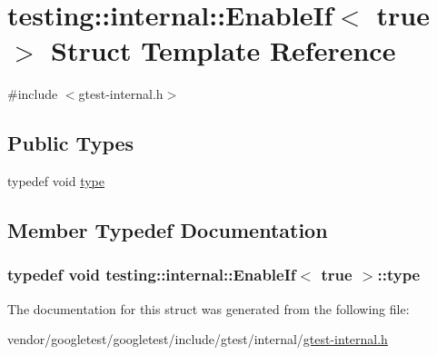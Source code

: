 \hypertarget{structtesting_1_1internal_1_1EnableIf_3_01true_01_4}{}\section{testing\+:\+:internal\+:\+:Enable\+If$<$ true $>$ Struct Template Reference}
\label{structtesting_1_1internal_1_1EnableIf_3_01true_01_4}


{\ttfamily \#include $<$gtest-\/internal.\+h$>$}

\subsection*{Public Types}
\begin{DoxyCompactItemize}
\item 
typedef void \hyperlink{structtesting_1_1internal_1_1EnableIf_3_01true_01_4_a9398d803f1fdd99ff41823746f6299ff}{type}
\end{DoxyCompactItemize}


\subsection{Member Typedef Documentation}
\subsubsection[{\texorpdfstring{type}{type}}]{\setlength{\rightskip}{0pt plus 5cm}typedef void {\bf testing\+::internal\+::\+Enable\+If}$<$ true $>$\+::{\bf type}}\hypertarget{structtesting_1_1internal_1_1EnableIf_3_01true_01_4_a9398d803f1fdd99ff41823746f6299ff}{}\label{structtesting_1_1internal_1_1EnableIf_3_01true_01_4_a9398d803f1fdd99ff41823746f6299ff}


The documentation for this struct was generated from the following file\+:\begin{DoxyCompactItemize}
\item 
vendor/googletest/googletest/include/gtest/internal/\hyperlink{gtest-internal_8h}{gtest-\/internal.\+h}\end{DoxyCompactItemize}
